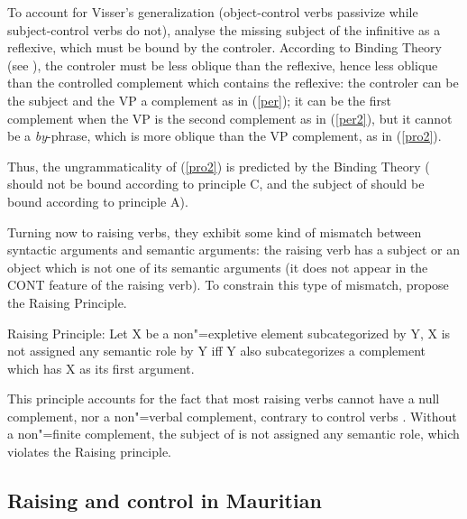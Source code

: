 \documentclass[output=paper
                ,modfonts
                ,nonflat
	        ,collection
	        ,collectionchapter
	        ,collectiontoclongg
 	        ,biblatex
                ,babelshorthands
                ,newtxmath
                ,draftmode
                ,colorlinks, citecolor=brown
]{./langsci/langscibook}
\begin{document}
To account for Visser's generalization (object-control verbs passivize  while subject-control verbs do not), \citet{SagandPollard1991} analyse the missing subject of the infinitive as a reflexive, which must be bound by the controler. According to Binding Theory (see ), the controler must be less oblique than the reflexive, hence less oblique than the controlled complement which contains the reflexive: the controler can be the subject and the VP a complement as in (\ref{per}); it can be the first complement when the VP is the second complement as in (\ref{per2}), but it cannot be a  \emph{by}-phrase, which is more oblique than the VP complement, as in (\ref{pro2}).

\eal
{}
\zl

Thus, the ungrammaticality of (\ref{pro2}) is predicted by the Binding Theory ( should not be bound according to principle C, and the subject of  should be bound according to principle A).

Turning now to raising verbs, they exhibit some kind of mismatch between syntactic arguments and
semantic arguments: the raising verb has a subject or an object which is not one of its semantic
arguments (it does not appear in the CONT feature of the raising verb). To constrain this type of
mismatch, \citet[140]{PollardandSag1994} propose the Raising Principle.

\begin{exe}
\ex Raising Principle: Let X be a non"=expletive element subcategorized by Y, X is not assigned any semantic role by Y iff Y also subcategorizes a complement which has X as its first argument.
\end{exe}

This principle accounts for the fact  that most raising verbs cannot have a null complement, nor a non"=verbal complement, contrary to control verbs \citep{Jacobson1990}. Without a non"=finite complement, the subject of  is not assigned any semantic role, which violates the Raising principle.

\eal
{}
\zl


\subsection{Raising and control in Mauritian}
\end{document}
